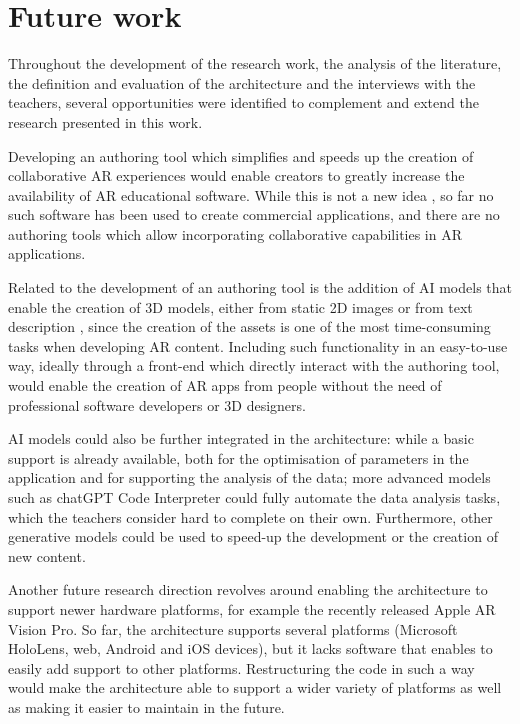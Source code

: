 \section{Future work}
Throughout the development of the research work, the analysis of the literature, the definition and evaluation of the architecture and the interviews with the teachers, several opportunities were identified to complement and extend the research presented in this work.

Developing an authoring tool which simplifies and speeds up the creation of collaborative AR experiences would enable creators to greatly increase the availability of AR educational software. While this is not a new idea \citep{rajaram2022paper, thanyadit2022easy}, so far no such software has been used to create commercial applications, and there are no authoring tools which allow incorporating collaborative capabilities in AR applications.

Related to the development of an authoring tool is the addition of AI models that enable the creation of 3D models, either from static 2D images \citep{mildenhall2021nerf} or from text description \citep{poole2022dreamfusion, deitke2023objaversexl}, since the creation of the assets is one of the most time-consuming tasks when developing AR content. Including such functionality in an easy-to-use way, ideally through a front-end which directly interact with the authoring tool, would enable the creation of AR apps from people without the need of professional software developers or 3D designers.

AI models could also be further integrated in the architecture: while a basic support is already available, both for the optimisation of parameters in the application and for supporting the analysis of the data; more advanced models such as chatGPT Code Interpreter could fully automate the data analysis tasks, which the teachers consider hard to complete on their own. Furthermore, other generative models could be used to speed-up the development or the creation of new content.

Another future research direction revolves around enabling the \arch{} architecture to support newer hardware platforms, for example the recently released Apple AR Vision Pro. So far, the architecture supports several platforms (Microsoft HoloLens, web, Android and iOS devices), but it lacks software that enables to easily add support to other platforms. Restructuring the code in such a way would make the architecture able to support a wider variety of platforms as well as making it easier to maintain in the future. 

